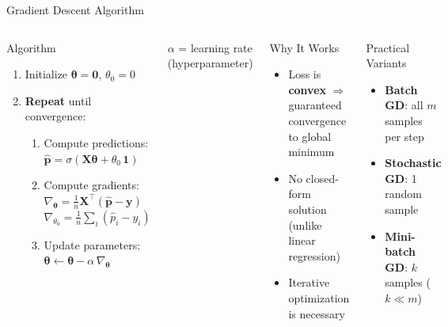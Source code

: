 \documentclass[aspectratio=169,11pt]{beamer}
\begin{document}
\begin{frame}{Gradient Descent Algorithm}
\begin{columns}[T]
\begin{block}{Algorithm}
\begin{enumerate}
  \item Initialize $\boldsymbol{\theta}=\boldsymbol{0}$, $\theta_0=0$
  \item \textbf{Repeat} until convergence:
  \begin{enumerate}
    \item Compute predictions: $\hat{\boldsymbol{p}} = \sigma(\mathbf{X}\boldsymbol{\theta}+\theta_0\,\boldsymbol{1})$
    \item Compute gradients:\\
      $\nabla_{\boldsymbol{\theta}} = \frac{1}{n}\mathbf{X}^\top(\hat{\boldsymbol{p}}-\boldsymbol{y})$\\
      $\nabla_{\theta_0} = \frac{1}{n}\sum_i(\hat{p}_i-y_i)$
    \item Update parameters:\\
      $\boldsymbol{\theta} \leftarrow \boldsymbol{\theta}-\alpha\,\nabla_{\boldsymbol{\theta}}$
  \end{enumerate}
\end{enumerate}
\end{block}
$\alpha$ = learning rate (hyperparameter)

\begin{exampleblock}{Why It Works}
\begin{itemize}
  \item Loss is \textbf{convex} $\Rightarrow$ guaranteed convergence to global minimum
  \item No closed-form solution (unlike linear regression)
  \item Iterative optimization is necessary
\end{itemize}
\end{exampleblock}

\vspace{0.4em}
\begin{block}{Practical Variants}
\begin{itemize}
  \item \textbf{Batch GD}: all $m$ samples per step
  \item \textbf{Stochastic GD}: 1 random sample
  \item \textbf{Mini-batch GD}: $k$ samples ($k\ll m$)
\end{itemize}
\end{block}
\end{columns}
\end{frame}
\end{document}
